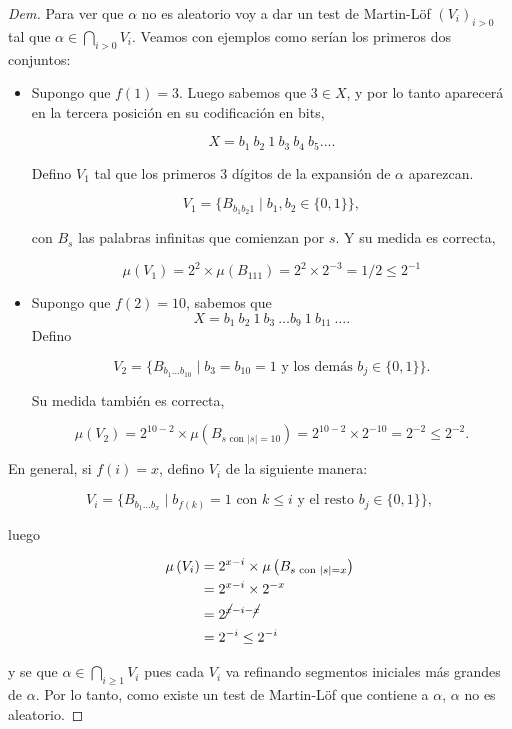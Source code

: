 \documentclass{article}
\theoremstyle{definition} %
\newcommand{\measure}[1]{\mu\left(#1\right)}
\begin{document}
\begin{proof}[Dem]
    Para ver que $\alpha$ no es aleatorio voy a dar un test de Martin-Löf
    $(V_i)_{i > 0}$ tal que $\alpha \in \bigcap_{i > 0} V_i$. Veamos con
    ejemplos como serían los primeros dos conjuntos:

    \begin{itemize}
        \item Supongo que $f(1) = 3$. Luego sabemos que $3 \in X$, y por lo
        tanto aparecerá en la tercera posición en su codificación en bits,
        
        \[
            X = b_1\ b_2\ 1\ b_3\ b_4\ b_5 \dots.
        \]
        
        Defino $V_1$ tal que los primeros 3 dígitos de la expansión de
        $\alpha$ aparezcan.

        \[
            V_1 = \{ 
                B_{b_1 b_2 1}
                \mid b_1, b_2 \in \{0, 1\}
            \},
        \]

        con $B_s$ las palabras infinitas que comienzan por $s$. Y su medida es
        correcta,

        \[
            \measure{V_1}
                = 2^2 \times \measure{B_{111}}
                = 2^2 \times 2^{-3} = 1/2
                \leq 2^{-1}
        \]

        \item Supongo que $f(2) = 10$, sabemos que 
        \[
            X = b_1\ b_2\ 1\ b_3\ \dots b_9\ 1\ b_{11}\ \dots.
        \]
        Defino

        \[
            V_2 = \{ 
                B_{b_1 \dots b_{10}}
                \mid b_3 = b_{10} = 1 \text{ y los demás } b_j \in \{0, 1\}
            \}.
        \]

        Su medida también es correcta,

        \[
            \measure{V_2}
                = 2^{10 - 2} \times \measure{B_{s \text{ con } |s| = 10}}
                = 2^{10 - 2} \times 2^{-10} = 2^{-2}
                \leq 2^{-2}.
        \]
    \end{itemize}

    En general, si $f(i) = x$, defino $V_i$ de la siguiente manera:

    \[
        V_i = \{ 
            B_{b_1 \dots b_{x}}
            \mid b_{f(k)} = 1 \text{ con } k \leq i \text{ y el resto } b_j \in \{0, 1\}
        \},
    \]

    luego

    \begin{align*}
        \measure{V_i}
            &= 2^{x - i} \times \measure{B_{s \text{ con } |s| = x}} \\
            &= 2^{x - i} \times 2^{-x} \\
            &= 2^{\cancel{x} - i - \cancel{x}} \\
            &= 2^{-i} \leq 2^{-i}
    \end{align*}

    y se que $\alpha \in \bigcap_{i \geq 1} V_i$ pues cada $V_i$ va refinando
    segmentos iniciales más grandes de $\alpha$. Por lo tanto, como existe un
    test de Martin-Löf que contiene a $\alpha$, $\alpha$ no es aleatorio.
\end{proof}
\end{document}
